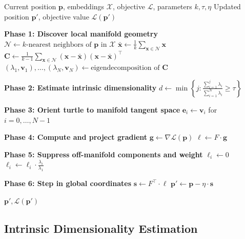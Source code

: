 \documentclass[11pt,letterpaper]{article}
\newcommand{\pos}{\mathbf{p}}
\newcommand{\basis}{\mathbf{e}}
\newcommand{\grad}{\nabla}
\newcommand{\obj}{\mathcal{L}}
\newcommand{\cov}{\mathbf{C}}
\begin{document}
\begin{algorithm}[H]
\caption{ManifoldWalker.Step}
\label{alg:step}
\begin{algorithmic}[1]
\Require Current position $\pos$, embeddings $\mathcal{X}$, objective $\obj$, parameters $k, \tau, \eta$
\Ensure Updated position $\pos'$, objective value $\obj(\pos')$
\Statex

\State \textbf{Phase 1: Discover local manifold geometry}
\State $\mathcal{N} \leftarrow k\text{-nearest neighbors of } \pos \text{ in } \mathcal{X}$
\State $\bar{\mathbf{x}} \leftarrow \frac{1}{k}\sum_{\mathbf{x} \in \mathcal{N}} \mathbf{x}$
\State $\cov \leftarrow \frac{1}{k-1}\sum_{\mathbf{x} \in \mathcal{N}} (\mathbf{x} - \bar{\mathbf{x}})(\mathbf{x} - \bar{\mathbf{x}})^\top$
\State $(\lambda_1, \mathbf{v}_1), \ldots, (\lambda_N, \mathbf{v}_N) \leftarrow \text{eigendecomposition of } \cov$ 

\Statex
\State \textbf{Phase 2: Estimate intrinsic dimensionality}
\State $d \leftarrow \min\left\{j : \frac{\sum_{i=1}^{j} \lambda_i}{\sum_{i=1}^{N} \lambda_i} \geq \tau\right\}$

\Statex
\State \textbf{Phase 3: Orient turtle to manifold tangent space}
\State $\basis_i \leftarrow \mathbf{v}_i$ for $i = 0, \ldots, N-1$ 

\Statex
\State \textbf{Phase 4: Compute and project gradient}
\State $\mathbf{g} \leftarrow \grad\obj(\pos)$ 
\State $\bm{\ell} \leftarrow F \cdot \mathbf{g}$ 

\Statex
\State \textbf{Phase 5: Suppress off-manifold components and weight}
    \State $\ell_i \leftarrow 0$ 
  \Else
    \State $\ell_i \leftarrow \ell_i \cdot \frac{\lambda_i}{\lambda_1}$ 
  \EndIf
\EndFor

\Statex
\State \textbf{Phase 6: Step in global coordinates}
\State $\mathbf{s} \leftarrow F^\top \cdot \bm{\ell}$ 
\State $\pos' \leftarrow \pos - \eta \cdot \mathbf{s}$ 

\Statex
\State \Return $\pos', \obj(\pos')$
\end{algorithmic}
\end{algorithm}

\subsection{Intrinsic Dimensionality Estimation}
\end{document}
